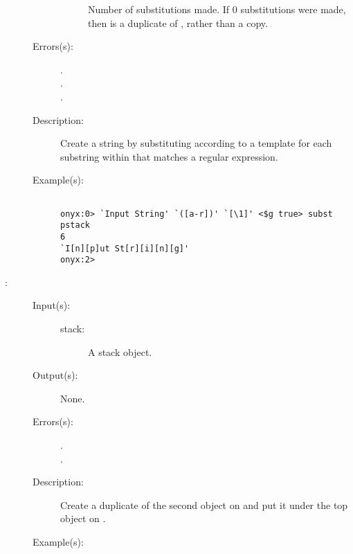 \begin{description}
\begin{description}
\begin{description}
			Number of substitutions made.  If 0 substitutions were
			made, then  is a duplicate of
			, rather than a copy.
		\end{description}
	\item[Errors(s): ]
		\begin{description}\item[]
		\item[.]
		\item[.]
		\item[.]
		\end{description}
	\item[Description: ]
		Create a string by substituting according to a template for each
		substring within  that matches a regular
		expression.
	\item[Example(s): ]\begin{verbatim}

onyx:0> `Input String' `([a-r])' `[\1]' <$g true> subst pstack
6
`I[n][p]ut St[r][i][n][g]'
onyx:2>
		\end{verbatim}
	\end{description}
\label{systemdict:sunder}
\item[{\onyxop{stack}{sunder}{--}}: ]
	\begin{description}\item[]
	\item[Input(s): ]
		\begin{description}\item[]
		\item[stack: ]
			A stack object.
		\end{description}
	\item[Output(s): ] None.
	\item[Errors(s): ]
		\begin{description}\item[]
		\item[.]
		\item[.]
		\end{description}
	\item[Description: ]
		Create a duplicate of the second object on  and put
		it under the top object on .
	\item[Example(s): ]\begin{verbatim}


\end{verbatim}
\end{description}
\end{description}
